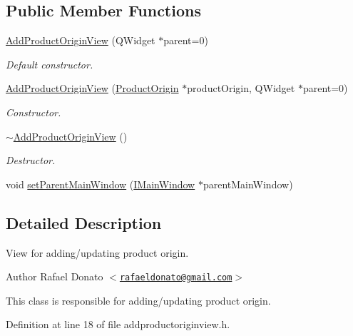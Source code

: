 \subsection*{\-Public \-Member \-Functions}
\begin{DoxyCompactItemize}
\item 
\hyperlink{class_add_product_origin_view_a928646cbee81c32b57d27549f6617dac}{\-Add\-Product\-Origin\-View} (\-Q\-Widget $\ast$parent=0)
\begin{DoxyCompactList}\small\item\em \-Default constructor. \end{DoxyCompactList}\item 
\hyperlink{class_add_product_origin_view_a4b42e9e56e2ef9d7b55b625edeae94bc}{\-Add\-Product\-Origin\-View} (\hyperlink{class_product_origin}{\-Product\-Origin} $\ast$product\-Origin, \-Q\-Widget $\ast$parent=0)
\begin{DoxyCompactList}\small\item\em \-Constructor. \end{DoxyCompactList}\item 
\hyperlink{class_add_product_origin_view_a4af2610db9268eb1a662be72ce929a7a}{$\sim$\-Add\-Product\-Origin\-View} ()
\begin{DoxyCompactList}\small\item\em \-Destructor. \end{DoxyCompactList}\item 
void \hyperlink{class_add_product_origin_view_abbe9869a92cb684b3c176ef82d048238}{set\-Parent\-Main\-Window} (\hyperlink{class_i_main_window}{\-I\-Main\-Window} $\ast$parent\-Main\-Window)
\end{DoxyCompactItemize}


\subsection{\-Detailed \-Description}
\-View for adding/updating product origin. 

\begin{DoxyAuthor}{\-Author}
\-Rafael \-Donato $<$\href{mailto:rafaeldonato@gmail.com}{\tt rafaeldonato@gmail.\-com}$>$
\end{DoxyAuthor}
\-This class is responsible for adding/updating product origin. 

\-Definition at line 18 of file addproductoriginview.\-h.



